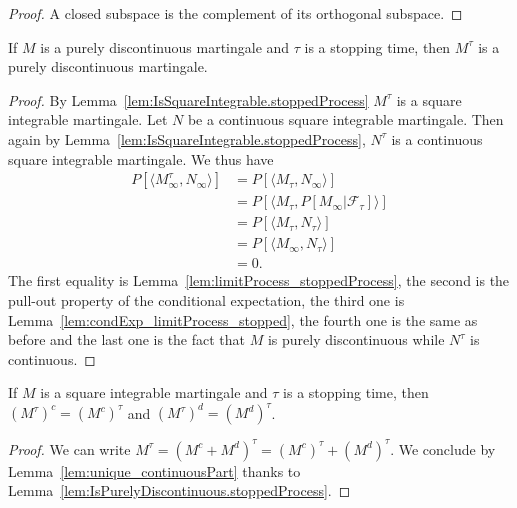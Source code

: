 \begin{proof}
  \leanok
A closed subspace is the complement of its orthogonal subspace.
\end{proof}


\begin{lemma}\label{lem:IsPurelyDiscontinuous.stoppedProcess}
  \leanok
If $M$ is a purely discontinuous martingale and $\tau$ is a stopping time, then $M^\tau$ is a purely discontinuous martingale.
\end{lemma}

\begin{proof}
  \leanok
By Lemma~\ref{lem:IsSquareIntegrable.stoppedProcess} $M^\tau$ is a square integrable martingale. Let $N$ be a continuous square integrable martingale. Then again by Lemma~\ref{lem:IsSquareIntegrable.stoppedProcess}, $N^\tau$ is a continuous square integrable martingale. We thus have
\begin{align*}
  P[\langle M^\tau_\infty, N_\infty\rangle] & = P[\langle M_\tau, N_\infty\rangle] \\
  & = P[\langle M_\tau, P[M_\infty | \mathcal{F}_\tau]\rangle] \\
  & = P[\langle M_\tau, N_\tau\rangle] \\
  & = P[\langle M_\infty, N_\tau\rangle] \\
  & = 0.
\end{align*}
The first equality is Lemma~\ref{lem:limitProcess_stoppedProcess}, the second is the pull-out property of the conditional expectation, the third one is Lemma~\ref{lem:condExp_limitProcess_stopped}, the fourth one is the same as before and the last one is the fact that $M$ is purely discontinuous while $N^\tau$ is continuous.
\end{proof}


\begin{lemma}\label{lem:continuousPart_stoppedProcess}
  \leanok
If $M$ is a square integrable martingale and $\tau$ is a stopping time, then $(M^\tau)^c = (M^c)^\tau$ and $(M^\tau)^d = (M^d)^\tau$.
\end{lemma}

\begin{proof}
  \leanok
We can write $M^\tau = (M^c + M^d)^\tau = (M^c)^\tau + (M^d)^\tau$. We conclude by Lemma~\ref{lem:unique_continuousPart} thanks to Lemma~\ref{lem:IsPurelyDiscontinuous.stoppedProcess}.
\end{proof}



